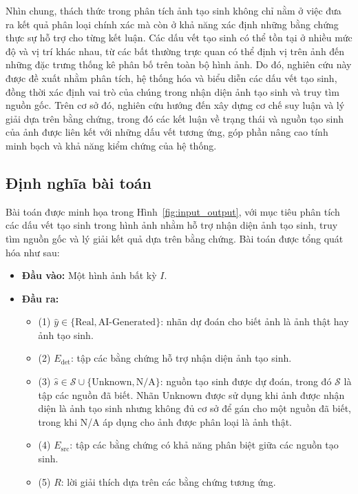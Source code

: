\documentclass[12pt]{report}
\begin{document}
Nhìn chung, thách thức trong phân tích ảnh tạo sinh không chỉ nằm ở việc đưa ra kết quả phân loại chính xác mà còn ở khả năng xác định những bằng chứng thực sự hỗ trợ cho từng kết luận. Các dấu vết tạo sinh có thể tồn tại ở nhiều mức độ và vị trí khác nhau, từ các bất thường trực quan có thể định vị trên ảnh đến những đặc trưng thống kê phân bố trên toàn bộ hình ảnh. Do đó, nghiên cứu này được đề xuất nhằm phân tích, hệ thống hóa và biểu diễn các dấu vết tạo sinh, đồng thời xác định vai trò của chúng trong nhận diện ảnh tạo sinh và truy tìm nguồn gốc. Trên cơ sở đó, nghiên cứu hướng đến xây dựng cơ chế suy luận và lý giải dựa trên bằng chứng, trong đó các kết luận về trạng thái và nguồn tạo sinh của ảnh được liên kết với những dấu vết tương ứng, góp phần nâng cao tính minh bạch và khả năng kiểm chứng của hệ thống.


\subsection{Định nghĩa bài toán}

Bài toán được minh họa trong Hình~\ref{fig:input_output}, với mục tiêu phân tích các dấu vết tạo sinh trong hình ảnh nhằm hỗ trợ nhận diện ảnh tạo sinh, truy tìm nguồn gốc và lý giải kết quả dựa trên bằng chứng. Bài toán được tổng quát hóa như sau:

\begin{itemize}
    \item \textbf{Đầu vào:} Một hình ảnh bất kỳ $I$.

    \item \textbf{Đầu ra:}
    \begin{itemize}
        \item (1) $\hat{y} \in \{\text{Real}, \text{AI-Generated}\}$: nhãn dự đoán cho biết ảnh là ảnh thật hay ảnh tạo sinh.

        \item (2) $E_{\mathrm{det}}$: tập các bằng chứng hỗ trợ nhận diện ảnh tạo sinh.

        \item (3) $\hat{s} \in \mathcal{S} \cup \{\text{Unknown}, \text{N/A}\}$: nguồn tạo sinh được dự đoán, trong đó $\mathcal{S}$ là tập các nguồn đã biết. Nhãn Unknown được sử dụng khi ảnh được nhận diện là ảnh tạo sinh nhưng không đủ cơ sở để gán cho một nguồn đã biết, trong khi N/A áp dụng cho ảnh được phân loại là ảnh thật.

        \item (4) $E_{\mathrm{src}}$: tập các bằng chứng có khả năng phân biệt giữa các nguồn tạo sinh.

        \item (5) $R$: lời giải thích dựa trên các bằng chứng tương ứng.

    \end{itemize}
\end{itemize}
\end{document}
